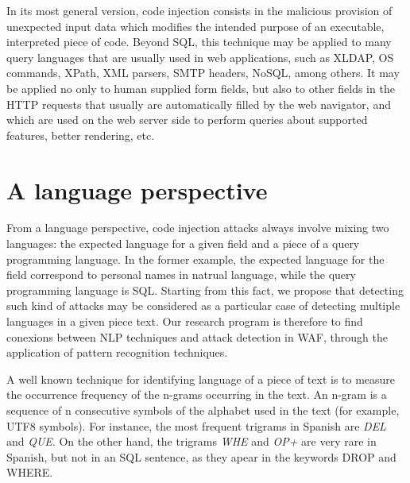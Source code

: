 \documentclass[runningheads,a4paper]{llncs}
\begin{document}
In its most general version, code injection consists in the malicious provision of unexpected input data which modifies the intended purpose of an executable, interpreted piece of code. Beyond SQL, this technique may be applied to many query languages that are usually used in web applications, such as XLDAP, OS commands, XPath, XML parsers, SMTP headers, NoSQL, among others. It may be applied no only to human supplied form fields, but also to other fields in the HTTP requests that usually are automatically filled by the web navigator, and which are used on the web server side to perform queries about supported features, better rendering, etc. 

\section{A language perspective}

From a language perspective, code injection attacks always involve mixing two languages: the expected language for a given field and a piece of a query programming language. In the former example, the expected language for the field correspond to personal names in natrual language, while the query programming language is SQL. Starting from this fact, we propose that detecting such kind of attacks may be considered as a particular case of detecting multiple languages in a given piece text. Our research program is therefore to find conexions between NLP techniques and attack detection in WAF, through the application of pattern recognition techniques.

A well known technique for identifying language of a piece of text is to measure the occurrence frequency of the n-grams occurring in the text. An n-gram is a sequence of n consecutive symbols of the alphabet used in the text (for example, UTF8 symbols). For instance, the most frequent trigrams in Spanish are \textit{DEL} and \textit{QUE}. On the other hand, the trigrams \textit{WHE} and \textit{OP+} are very rare in Spanish, but not in an SQL sentence, as they apear in the keywords DROP and WHERE. 
\end{document}
